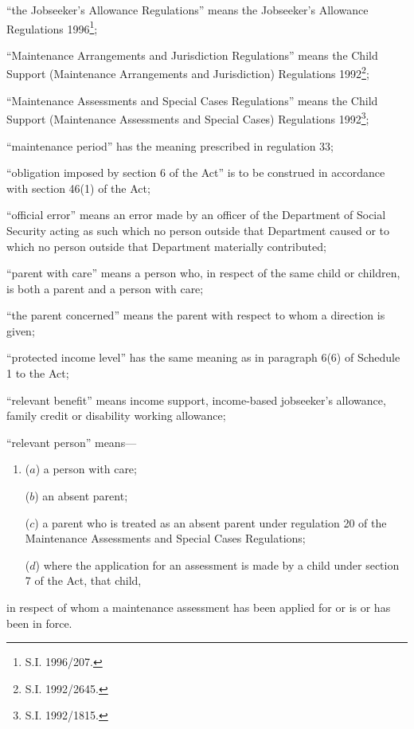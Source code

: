 \documentclass[a4paper,12pt]{article}
\begin{document}
\begin{enumerate}
\begin{sloppypar}
“the Jobseeker’s Allowance Regulations” means the Jobseeker’s Allowance Regulations 1996\footnote{\frenchspacing S.I. 1996/207.};
\end{sloppypar}

“Maintenance Arrangements and Jurisdiction Regulations” means the Child Support (Maintenance Arrangements and Jurisdiction) Regulations 1992\footnote{\frenchspacing S.I. 1992/2645.};

“Maintenance Assessments and Special Cases Regulations” means the Child Support (Maintenance Assessments and Special Cases) Regulations 1992\footnote{\frenchspacing S.I. 1992/1815.};

“maintenance period” has the meaning prescribed in regulation 33;

“obligation imposed by section 6 of the Act” is to be construed in accordance with section 46(1) of the Act;

“official error” means an error made by an officer of the Department of Social Security acting as such which no person outside that Department caused or to which no person outside that Department materially contributed;

“parent with care” means a person who, in respect of the same child or children, is both a parent and a person with care;

“the parent concerned” means the parent with respect to whom a direction is given;

“protected income level” has the same meaning as in paragraph 6(6) of Schedule 1 to the Act;

“relevant benefit” means income support, 
income-based jobseeker’s allowance,  %
family credit or disability working allowance;

“relevant person” means—
\begin{enumerate}\item[]
($a$) a person with care;

($b$) an absent parent;

($c$) a parent who is treated as an absent parent under regulation 20 of the Maintenance Assessments and Special Cases Regulations;

($d$) where the application for an assessment is made by a child under section 7 of the Act, that child,
\end{enumerate}
in respect of whom a maintenance assessment has been applied for or is or has been in force.
\end{enumerate}
\end{document}
